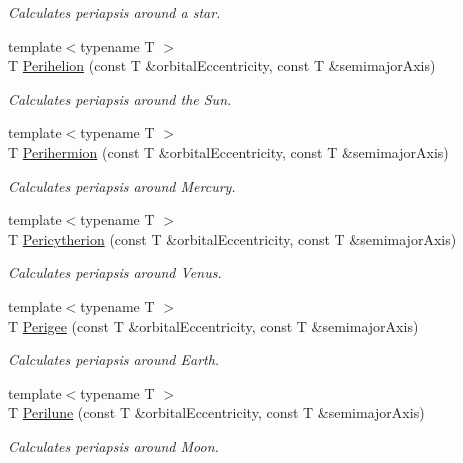 \begin{DoxyCompactItemize}
\begin{DoxyCompactList}\small\item\em Calculates periapsis around a star. \end{DoxyCompactList}\item 
{\footnotesize template$<$typename T $>$ }\\T \mbox{\hyperlink{group___e_g_x_phys-_periapsis_ga941d285e3a0b48ada9c9f60925ff63c2}{Perihelion}} (const T \&orbital\+Eccentricity, const T \&semimajor\+Axis)
\begin{DoxyCompactList}\small\item\em Calculates periapsis around the Sun. \end{DoxyCompactList}\item 
{\footnotesize template$<$typename T $>$ }\\T \mbox{\hyperlink{group___e_g_x_phys-_periapsis_ga9562e9cbfd73019ae9cdaa643b843d63}{Perihermion}} (const T \&orbital\+Eccentricity, const T \&semimajor\+Axis)
\begin{DoxyCompactList}\small\item\em Calculates periapsis around Mercury. \end{DoxyCompactList}\item 
{\footnotesize template$<$typename T $>$ }\\T \mbox{\hyperlink{group___e_g_x_phys-_periapsis_gaa270e364cbbd7d3d6212872df484926f}{Pericytherion}} (const T \&orbital\+Eccentricity, const T \&semimajor\+Axis)
\begin{DoxyCompactList}\small\item\em Calculates periapsis around Venus. \end{DoxyCompactList}\item 
{\footnotesize template$<$typename T $>$ }\\T \mbox{\hyperlink{group___e_g_x_phys-_periapsis_gae2d053caf69cb0b4c3207064a2ab143a}{Perigee}} (const T \&orbital\+Eccentricity, const T \&semimajor\+Axis)
\begin{DoxyCompactList}\small\item\em Calculates periapsis around Earth. \end{DoxyCompactList}\item 
{\footnotesize template$<$typename T $>$ }\\T \mbox{\hyperlink{group___e_g_x_phys-_periapsis_ga2cc7ab05e18d32c94d8d74972e032793}{Perilune}} (const T \&orbital\+Eccentricity, const T \&semimajor\+Axis)
\begin{DoxyCompactList}\small\item\em Calculates periapsis around Moon. \end{DoxyCompactList}\item 

\end{DoxyCompactItemize}
